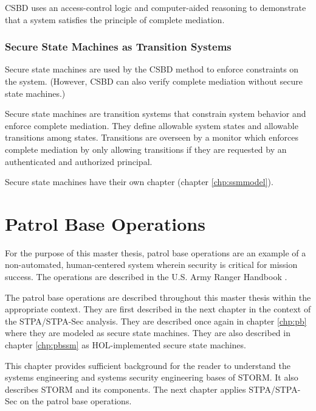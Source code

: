 \documentclass[../../main/main.tex]{subfiles}
\begin{document}
CSBD uses an access-control logic and computer-aided reasoning to demonstrate that a system satisfies the principle of complete mediation.

\subsubsection{Secure State Machines as Transition Systems }\label{sssect:ssmts}
Secure state machines are used by the CSBD method to enforce constraints on the system.  (However, CSBD can also verify complete mediation without secure state machines.)

Secure state machines are transition systems that constrain system behavior and enforce complete mediation.  They define allowable system states and allowable transitions among states. Transitions are overseen by a monitor which enforces complete mediation by only allowing transitions if they are requested by an authenticated and authorized principal. 

Secure state machines have their own chapter (chapter \ref{chp:ssmmodel}).
\section{Patrol Base Operations}\label{sec:stormpb}
For the purpose of this master thesis, patrol base operations are an example of a non-automated, human-centered system wherein security is critical for mission success.  The operations are described in the U.S. Army Ranger Handbook \cite{rangermanual}.

The patrol base operations are described throughout this master thesis within the appropriate context.  They are first described in the next chapter in the context of the STPA/STPA-Sec analysis.  They are described once again in chapter \ref{chp:pb} where they are modeled as secure state machines.  They are also described in chapter \ref{chp:pbssm} as HOL-implemented secure state machines.

This chapter provides sufficient background for the reader to understand the systems engineering and systems security engineering bases of STORM.  It also describes STORM and its components.  The next chapter applies STPA/STPA-Sec on the patrol base operations.
\end{document}
